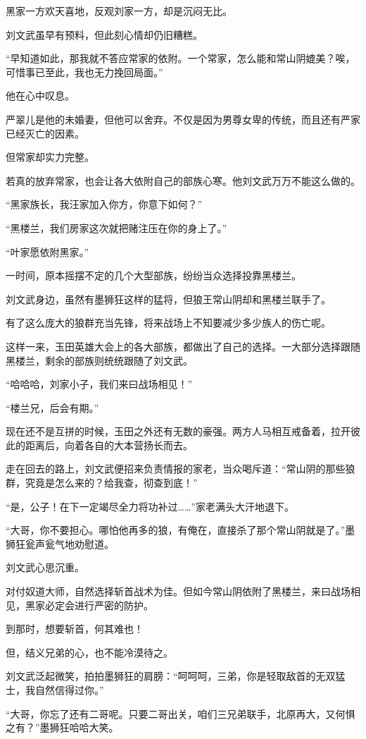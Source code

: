 \begin{this_body}
黑家一方欢天喜地，反观刘家一方，却是沉闷无比。

刘文武虽早有预料，但此刻心情却仍旧糟糕。

“早知道如此，那我就不答应常家的依附。一个常家，怎么能和常山阴媲美？唉，可惜事已至此，我也无力挽回局面。”

他在心中叹息。

严翠儿是他的未婚妻，但他可以舍弃。不仅是因为男尊女卑的传统，而且还有严家已经灭亡的因素。

但常家却实力完整。

若真的放弃常家，也会让各大依附自己的部族心寒。他刘文武万万不能这么做的。

“黑家族长，我汪家加入你方，你意下如何？”

“黑楼兰，我们房家这次就把赌注压在你的身上了。”

“叶家愿依附黑家。”

一时间，原本摇摆不定的几个大型部族，纷纷当众选择投靠黑楼兰。

刘文武身边，虽然有墨狮狂这样的猛将，但狼王常山阴却和黑楼兰联手了。

有了这么庞大的狼群充当先锋，将来战场上不知要减少多少族人的伤亡呢。

这样一来，玉田英雄大会上的各大部族，都做出了自己的选择。一大部分选择跟随黑楼兰，剩余的部族则统统跟随了刘文武。

“哈哈哈，刘家小子，我们来曰战场相见！”

“楼兰兄，后会有期。”

现在还不是互拼的时候，玉田之外还有无数的豪强。两方人马相互戒备着，拉开彼此的距离后，向着各自的大本营扬长而去。

走在回去的路上，刘文武便招来负责情报的家老，当众喝斥道：“常山阴的那些狼群，究竟是怎么来的？给我查，彻查到底！”

“是，公子！在下一定竭尽全力将功补过……”家老满头大汗地退下。

“大哥，你不要担心。哪怕他再多的狼，有俺在，直接杀了那个常山阴就是了。”墨狮狂瓮声瓮气地劝慰道。

刘文武心思沉重。

对付奴道大师，自然选择斩首战术为佳。但如今常山阴依附了黑楼兰，来曰战场相见，黑家必定会进行严密的防护。

到那时，想要斩首，何其难也！

但，结义兄弟的心，也不能冷漠待之。

刘文武泛起微笑，拍拍墨狮狂的肩膀：“呵呵呵，三弟，你是轻取敌首的无双猛士，我自然信得过你。”

“大哥，你忘了还有二哥呢。只要二哥出关，咱们三兄弟联手，北原再大，又何惧之有？”墨狮狂哈哈大笑。


\end{this_body}
